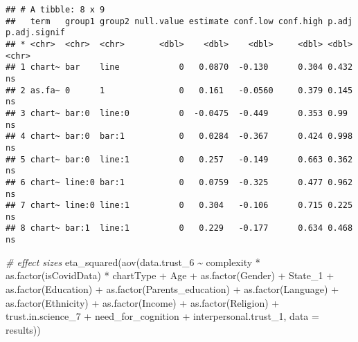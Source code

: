 \documentclass[
]{article}
\newenvironment{Shaded}{\begin{snugshade}}{\end{snugshade}}
\newcommand{\AttributeTok}[1]{\textcolor[rgb]{0.77,0.63,0.00}{#1}}
\newcommand{\CommentTok}[1]{\textcolor[rgb]{0.56,0.35,0.01}{\textit{#1}}}
\newcommand{\FunctionTok}[1]{\textcolor[rgb]{0.00,0.00,0.00}{#1}}
\newcommand{\NormalTok}[1]{#1}
\newcommand{\SpecialCharTok}[1]{\textcolor[rgb]{0.00,0.00,0.00}{#1}}
\begin{document}
\begin{verbatim}
## # A tibble: 8 x 9
##   term   group1 group2 null.value estimate conf.low conf.high p.adj p.adj.signif
## * <chr>  <chr>  <chr>       <dbl>    <dbl>    <dbl>     <dbl> <dbl> <chr>       
## 1 chart~ bar    line            0   0.0870  -0.130      0.304 0.432 ns          
## 2 as.fa~ 0      1               0   0.161   -0.0560     0.379 0.145 ns          
## 3 chart~ bar:0  line:0          0  -0.0475  -0.449      0.353 0.99  ns          
## 4 chart~ bar:0  bar:1           0   0.0284  -0.367      0.424 0.998 ns          
## 5 chart~ bar:0  line:1          0   0.257   -0.149      0.663 0.362 ns          
## 6 chart~ line:0 bar:1           0   0.0759  -0.325      0.477 0.962 ns          
## 7 chart~ line:0 line:1          0   0.304   -0.106      0.715 0.225 ns          
## 8 chart~ bar:1  line:1          0   0.229   -0.177      0.634 0.468 ns
\end{verbatim}

\begin{Shaded}
\begin{Highlighting}[]
\CommentTok{\# effect sizes}
\FunctionTok{eta\_squared}\NormalTok{(}\FunctionTok{aov}\NormalTok{(data.trust\_6 }\SpecialCharTok{\textasciitilde{}}\NormalTok{ complexity }\SpecialCharTok{*} \FunctionTok{as.factor}\NormalTok{(isCovidData) }\SpecialCharTok{*}\NormalTok{ chartType }\SpecialCharTok{+} 
\NormalTok{                  Age }\SpecialCharTok{+} \FunctionTok{as.factor}\NormalTok{(Gender) }\SpecialCharTok{+}\NormalTok{ State\_1 }\SpecialCharTok{+} \FunctionTok{as.factor}\NormalTok{(Education) }\SpecialCharTok{+} \FunctionTok{as.factor}\NormalTok{(Parents\_education) }\SpecialCharTok{+} \FunctionTok{as.factor}\NormalTok{(Language) }\SpecialCharTok{+} 
                  \FunctionTok{as.factor}\NormalTok{(Ethnicity) }\SpecialCharTok{+} \FunctionTok{as.factor}\NormalTok{(Income) }\SpecialCharTok{+} \FunctionTok{as.factor}\NormalTok{(Religion) }\SpecialCharTok{+}\NormalTok{ trust.in.science\_7 }\SpecialCharTok{+}\NormalTok{ need\_for\_cognition }\SpecialCharTok{+} 
\NormalTok{                  interpersonal.trust\_1,}
             \AttributeTok{data =}\NormalTok{ results))}
\end{Highlighting}
\end{Shaded}
\end{document}
